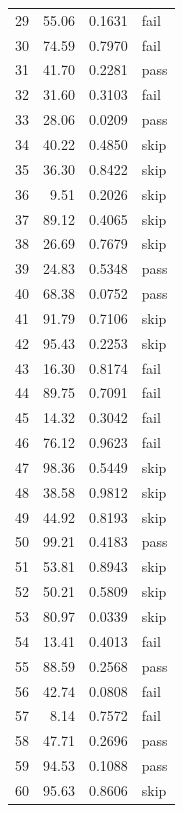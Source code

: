 \begin{longtable}{rrrl}
29 & \num{55.06} & \num{0.1631} & fail \\
30 & \num{74.59} & \num{0.7970} & fail \\
31 & \num{41.70} & \num{0.2281} & pass \\
32 & \num{31.60} & \num{0.3103} & fail \\
33 & \num{28.06} & \num{0.0209} & pass \\
34 & \num{40.22} & \num{0.4850} & skip \\
35 & \num{36.30} & \num{0.8422} & skip \\
36 & \num{9.51} & \num{0.2026} & skip \\
37 & \num{89.12} & \num{0.4065} & skip \\
38 & \num{26.69} & \num{0.7679} & skip \\
39 & \num{24.83} & \num{0.5348} & pass \\
40 & \num{68.38} & \num{0.0752} & pass \\
41 & \num{91.79} & \num{0.7106} & skip \\
42 & \num{95.43} & \num{0.2253} & skip \\
43 & \num{16.30} & \num{0.8174} & fail \\
44 & \num{89.75} & \num{0.7091} & fail \\
45 & \num{14.32} & \num{0.3042} & fail \\
46 & \num{76.12} & \num{0.9623} & fail \\
47 & \num{98.36} & \num{0.5449} & skip \\
48 & \num{38.58} & \num{0.9812} & skip \\
49 & \num{44.92} & \num{0.8193} & skip \\
50 & \num{99.21} & \num{0.4183} & pass \\
51 & \num{53.81} & \num{0.8943} & skip \\
52 & \num{50.21} & \num{0.5809} & skip \\
53 & \num{80.97} & \num{0.0339} & skip \\
54 & \num{13.41} & \num{0.4013} & fail \\
55 & \num{88.59} & \num{0.2568} & pass \\
56 & \num{42.74} & \num{0.0808} & fail \\
57 & \num{8.14} & \num{0.7572} & fail \\
58 & \num{47.71} & \num{0.2696} & pass \\
59 & \num{94.53} & \num{0.1088} & pass \\
60 & \num{95.63} & \num{0.8606} & skip \\
\end{longtable}

\lipsum[127-127]
